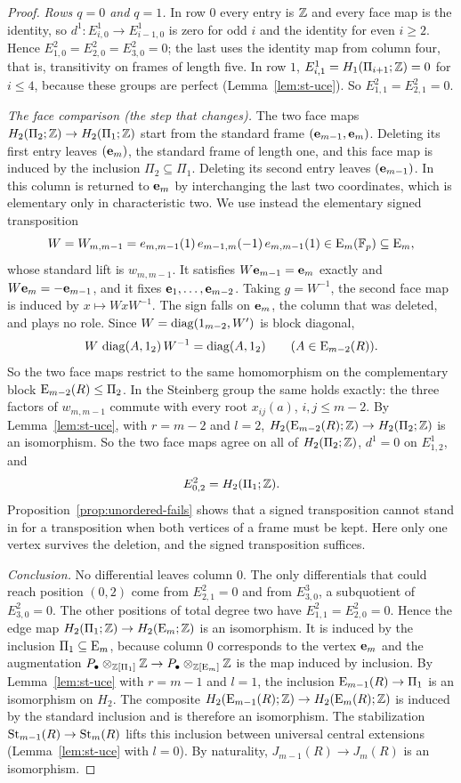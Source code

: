 \begin{proof}
\emph{Rows $q=0$ and $q=1$.} In row $0$ every entry is $\mathbb Z$ and every face map is the identity, so
$d^1\colon E^1_{i,0}\to E^1_{i-1,0}$ is zero for odd $i$ and the identity for even $i\geq2$. Hence
$E^2_{1,0}=E^2_{2,0}=E^2_{3,0}=0$; the last uses the identity map from column four, that is, transitivity on frames of
length five. In row $1$, $E^1_{i,1}=H_1(\Pi_{i+1};\mathbb Z)=0$ for $i\leq4$, because these groups are perfect
(Lemma~\ref{lem:st-uce}). So $E^2_{1,1}=E^2_{2,1}=0$.

\emph{The face comparison (the step that changes).} The two face maps $H_2(\Pi_2;\mathbb Z)\to H_2(\Pi_1;\mathbb Z)$
start from the standard frame $(\mathbf e_{m-1},\mathbf e_m)$. Deleting its first entry leaves $(\mathbf e_m)$, the standard
frame of length one, and this face map is induced by the inclusion $\Pi_2\subseteq\Pi_1$. Deleting its
second entry leaves $(\mathbf e_{m-1})$. In~\cite{OAI247rf} this column is returned to $\mathbf e_m$ by interchanging the last
two coordinates, which is elementary only in characteristic two. We use instead the elementary signed transposition
\[
 W=W_{m,m-1}=e_{m,m-1}(1)\,e_{m-1,m}(-1)\,e_{m,m-1}(1)\in\operatorname{E}_m(\mathbb F_p)\subseteq\operatorname{E}_m,
\]
whose standard lift is $w_{m,m-1}$. It satisfies $W\mathbf e_{m-1}=\mathbf e_m$ exactly and $W\mathbf e_m=-\mathbf e_{m-1}$, and it fixes
$\mathbf e_1,\dots,\mathbf e_{m-2}$. Taking $g=W^{-1}$, the second face map is induced by $x\mapsto WxW^{-1}$. The sign falls
on $\mathbf e_m$, the column that was deleted, and plays no role. Since $W=\operatorname{diag}(1_{m-2},W')$ is block diagonal,
\[
 W\,\operatorname{diag}(A,1_2)\,W^{-1}=\operatorname{diag}(A,1_2)\qquad(A\in\operatorname{E}_{m-2}(R)).
\]
So the two face maps restrict to the same homomorphism on the complementary block $\operatorname{E}_{m-2}(R)\leq\Pi_2$. In the
Steinberg group the same holds exactly: the three factors of $w_{m,m-1}$ commute with every root $x_{ij}(a)$,
$i,j\leq m-2$. By Lemma~\ref{lem:st-uce}, with $r=m-2$ and $l=2$, $H_2(\operatorname{E}_{m-2}(R);\mathbb Z)\to H_2(\Pi_2;\mathbb Z)$ is an
isomorphism. So the two face maps agree on all of $H_2(\Pi_2;\mathbb Z)$, $d^1=0$ on $E^1_{1,2}$, and
\[
 E^2_{0,2}=H_2(\Pi_1;\mathbb Z).
\]
Proposition~\ref{prop:unordered-fails} shows that a signed transposition cannot stand in for a transposition when both
vertices of a frame must be kept. Here only one vertex survives the deletion, and the signed transposition suffices.

\emph{Conclusion.} No differential leaves column $0$. The only differentials that could reach position $(0,2)$ come from
$E^2_{2,1}=0$ and from $E^3_{3,0}$, a subquotient of $E^2_{3,0}=0$. The other positions of total degree two have
$E^2_{1,1}=E^2_{2,0}=0$. Hence the edge map $H_2(\Pi_1;\mathbb Z)\to H_2(\operatorname{E}_m;\mathbb Z)$ is an isomorphism. It is induced by
the inclusion $\Pi_1\subseteq\operatorname{E}_m$, because column $0$ corresponds to the vertex $\mathbf e_m$ and the augmentation
$P_\bullet\otimes_{\mathbb Z[\Pi_1]}\mathbb Z\to P_\bullet\otimes_{\mathbb Z[\operatorname{E}_m]}\mathbb Z$ is the map induced by inclusion. By
Lemma~\ref{lem:st-uce} with $r=m-1$ and $l=1$, the inclusion $\operatorname{E}_{m-1}(R)\to\Pi_1$ is an isomorphism on $H_2$.
The composite $H_2(\operatorname{E}_{m-1}(R);\mathbb Z)\to H_2(\operatorname{E}_m(R);\mathbb Z)$ is induced by the standard inclusion and is therefore an
isomorphism. The stabilization $\operatorname{St}_{m-1}(R)\to\operatorname{St}_m(R)$ lifts this inclusion between universal central extensions
(Lemma~\ref{lem:st-uce} with $l=0$). By naturality, $J_{m-1}(R)\to J_m(R)$ is an isomorphism.


\end{proof}
